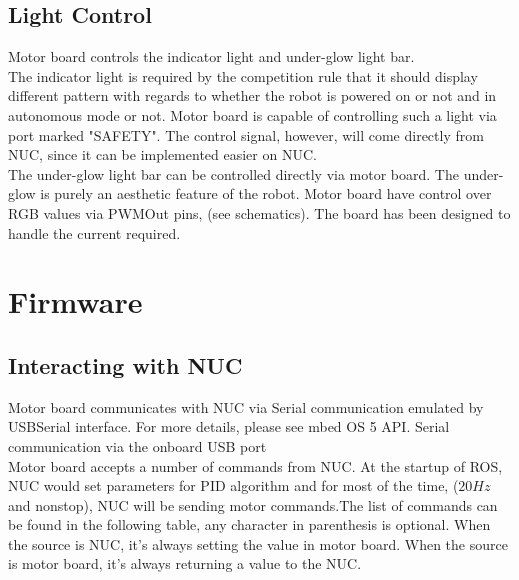 \documentclass[letterpaper, 12pt]{article}
\begin{document}
\subsection{Light Control}
Motor board controls the indicator light and under-glow light bar.\\

The indicator light is required by the competition rule that it should display different pattern with regards to whether the robot is powered on or not and in autonomous mode or not. Motor board is capable of controlling such a light via port marked "SAFETY". The control signal, however, will come directly from NUC, since it can be implemented easier on NUC.\\

The under-glow light bar can be controlled directly via motor board. The under-glow is purely an aesthetic feature of the robot. Motor board have control over RGB values via PWMOut pins, (see schematics). The board has been designed to handle the current required.

\pagebreak

\section{Firmware}
\subsection{Interacting with NUC}
Motor board communicates with NUC via Serial communication emulated by USBSerial interface. For more details, please see mbed OS 5 API. Serial communication via the onboard USB port \\

Motor board accepts a number of commands from NUC. At the startup of ROS, NUC would set parameters for PID algorithm and for most of the time, ($20Hz$ and nonstop), NUC will be sending motor commands.The list of commands can be found in the following table, any character in parenthesis is optional. When the source is NUC, it's always setting the value in motor board. When the source is motor board, it's always returning a value to the NUC.\\
\end{document}
